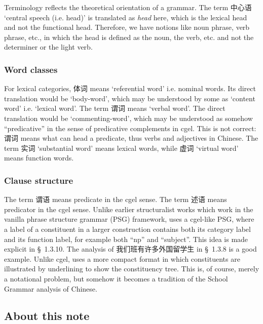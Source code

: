 \documentclass[UTF8, a4paper, oneside, scheme=plain]{ctexart}
\newcommand*{\citesec}[1]{\S~{#1}}
\newcommand*{\term}[1]{\emph{#1}}
\newcommand{\translate}[1]{`#1'}
\begin{document}
Terminology reflects the theoretical orientation of a grammar.
The term 中心语 \translate{central speech (i.e. head)}
is translated as \term{head} here,
which is the lexical head and not the functional head.
Therefore, we have notions like noun phrase, verb phrase, etc.,
in which the head is defined as the noun, the verb, etc.
and not the determiner or the light verb.

\subsubsection{Word classes}\label{sec:word-class-term}

For lexical categories, 体词 means \translate{referential word} i.e. nominal words.
Its direct translation would be \translate{body-word},
which may be understood by some as \translate{content word} i.e. \translate{lexical word}.
The term 谓词 means \translate{verbal word}.
The direct translation would be \translate{commenting-word},
which may be understood as somehow ``predicative'' in the sense of predicative complements in \ac{cgel}.
This is not correct: 
谓词 means what can head a predicate,
thus verbs and adjectives in Chinese.
The term 实词 \translate{substantial word} means lexical words,
while 虚词 \translate{virtual word} means function words.

\subsubsection{Clause structure}

The term 谓语 means predicate in the \ac{cgel} sense.
The term 述语 means predicator in the \ac{cgel} sense.
Unlike earlier structuralist works which work in the vanilla phrase structure grammar (PSG) framework,
\citet{zhudexigrammar} uses a \ac{cgel}-like PSG,
where a label of a constituent in a larger construction 
contains both its category label and its function label,
for example both ``\ac{np}'' and ``subject''.
This idea is made explicit in \citesec{1.3.10}.
The analysis of 我们班有许多外国留学生 in \citesec{1.3.8} is a good example.
Unlike \ac{cgel},
\citet{zhudexigrammar} uses a more compact format 
in which constituents are illustrated by underlining 
to show the constituency tree.
This is, of course, merely a notational problem,
but somehow it becomes a tradition of the School Grammar analysis of Chinese.

\subsection{About this note}
\end{document}
